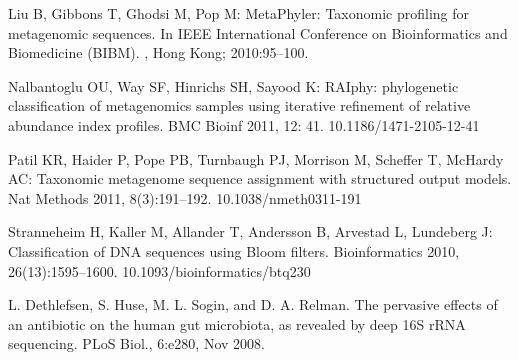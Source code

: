 \documentclass[10pt, a4paper]{article}[08.12.2015]
\begin{document}
\begin{thebibliography}{14}
      
	  Liu B, Gibbons T, Ghodsi M, Pop M: MetaPhyler: Taxonomic profiling for 		  metagenomic sequences. In IEEE International Conference on Bioinformatics 	  and Biomedicine (BIBM). , Hong Kong; 2010:95–100.
	  
	  Nalbantoglu OU, Way SF, Hinrichs SH, Sayood K: RAIphy: phylogenetic 			  classification of metagenomics samples using iterative refinement of 			  relative abundance index profiles. BMC Bioinf 2011, 12: 41. 					  10.1186/1471-2105-12-41
	  
	  Patil KR, Haider P, Pope PB, Turnbaugh PJ, Morrison M, Scheffer T, 			  McHardy AC: Taxonomic metagenome sequence assignment with structured 			  output models. Nat Methods 2011, 8(3):191–192. 10.1038/nmeth0311-191
		 
	  
	  Stranneheim H, Kaller M, Allander T, Andersson B, Arvestad L, Lundeberg 		  J: Classification of DNA sequences using Bloom filters. Bioinformatics 		  2010, 26(13):1595–1600. 10.1093/bioinformatics/btq230
	  
	  	   L. Dethlefsen, S. Huse, M. L. Sogin, and D. A. Relman. The pervasive effects of an
antibiotic on the human gut microbiota, as revealed by deep 16S rRNA sequencing.
PLoS Biol., 6:e280, Nov 2008.
	  

    \end{thebibliography}
\end{document}
